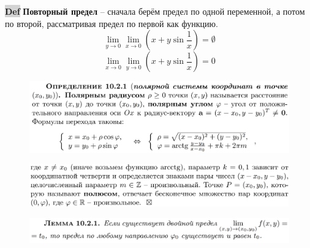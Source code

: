 \documentclass{article}
\newcommand{\bb}{\textbf}
\begin{document}
{\bfseries\colorbox{lightgray}{Def}} \bb{Повторный предел} -- сначала берём предел по одной переменной, а потом по второй, рассматривая предел по первой как функцию.
$$\lim\limits_{y\to 0}\lim\limits_{x\to 0} \left( x+y \sin\frac{1}{x} \right) = \emptyset$$
$$\lim\limits_{x\to 0}\lim\limits_{y \to 0}\left( x + y \sin \frac{1}{x} \right) = 0 $$

\newpage
\begin{figure}[h!]
    \centering
    \includegraphics[width=\textwidth]{17.png}
    \vspace{-1cm}
\end{figure}
\begin{figure}[h!]
    \centering
    \includegraphics[width=\textwidth]{18.png}
    \vspace{-1cm}
\end{figure}
\begin{figure}[h!]
    \centering
    \vspace{-1cm}
\end{figure}
\begin{figure}[h!]
    \centering
    \includegraphics[width=\textwidth]{20.png}
    \vspace{-1cm}
\end{figure}
\end{document}
